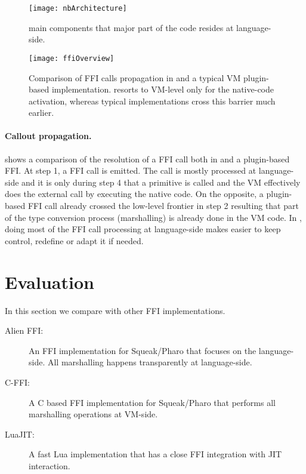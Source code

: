 \begin{figure}[h]
	\centering
	\texttt{[image: nbArchitecture]}
	\caption{\NB main components that major part of the code resides at language-side.}
\end{figure}

\begin{figure*}[t]
	\centering
	\texttt{[image: ffiOverview]}
	\caption{Comparison of FFI calls propagation in \NBFFI and a typical VM plugin-based implementation. \NB resorts to VM-level only for the native-code activation, whereas typical implementations cross this barrier much earlier.}
\end{figure*}

\paragraph{Callout propagation.}
 shows a comparison of the resolution of a FFI call both in \NBFFI and a plugin-based FFI.
At step 1, a FFI call is emitted.
The \NBFFI call is mostly processed at language-side and it is only during step 4 that a primitive is called and the VM effectively does the external call by executing the native code.
On the opposite, a plugin-based FFI call already crossed the low-level frontier in step 2 resulting that part of the type conversion process (marshalling) is already done in the VM code.
In \NBFFI, doing most of the FFI call processing at language-side makes easier to keep control, redefine or adapt it if needed.

\section{\NBFFI Evaluation}

In this section we compare \NB with other FFI implementations.
\begin{description}
	\item[Alien FFI:] An FFI implementation for Squeak/Pharo that focuses on the language-side. All marshalling happens transparently at language-side.
	\item[C-FFI:] A C based FFI implementation for Squeak/Pharo that performs all marshalling operations at VM-side.
	\item[LuaJIT:] A fast Lua implementation that has a close FFI integration with JIT interaction.
\end{description}

